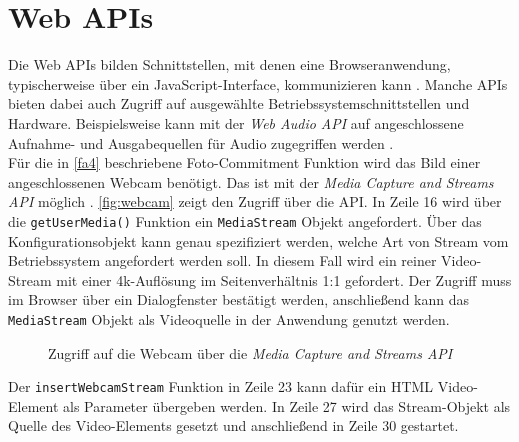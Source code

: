\section{Web APIs}
\label{sec:web-apis}

Die Web APIs bilden Schnittstellen, mit denen eine Browseranwendung, typischerweise über ein JavaScript-Interface,
kommunizieren kann \cite{web-apis}. Manche APIs bieten dabei auch Zugriff auf ausgewählte 
Betriebssystemschnittstellen und Hardware. Beispielsweise kann mit der \emph{Web Audio API} auf 
angeschlossene Aufnahme- und Ausgabequellen für Audio zugegriffen werden \cite{web-audio-api}.\\
Für die in \ref{fa4} beschriebene
Foto-Commitment Funktion wird das Bild einer angeschlossenen Webcam benötigt. Das ist mit der \emph{Media Capture and 
Streams API} möglich \cite{media-stream}. \autoref{fig:webcam} zeigt den Zugriff über die API. In Zeile 16 wird 
über die \texttt{getUserMedia()} Funktion ein \texttt{MediaStream} Objekt angefordert. Über das Konfigurationsobjekt
kann genau spezifiziert werden, welche Art von Stream vom Betriebssystem angefordert werden soll. In diesem Fall
wird ein reiner Video-Stream mit einer 4k-Auflösung im Seitenverhältnis 1:1 gefordert. Der Zugriff muss 
im Browser über ein Dialogfenster bestätigt werden, anschließend kann das \texttt{MediaStream} Objekt als
Videoquelle in der Anwendung genutzt werden. 

\begin{figure}
  
  \caption{Zugriff auf die Webcam über die \emph{Media Capture and Streams API}}
  \label{fig:webcam}
\end{figure}

Der \texttt{insertWebcamStream} Funktion in Zeile 23 kann dafür
ein HTML Video-Element als Parameter übergeben werden. In Zeile 27 wird das Stream-Objekt als Quelle
des Video-Elements gesetzt und anschließend in Zeile 30 gestartet.
